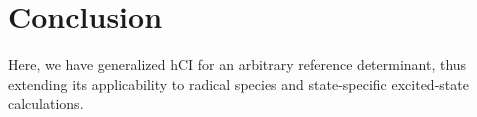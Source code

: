 \documentclass[aip,jcp,reprint,noshowkeys,superscriptaddress]{revtex4-1}
\newcommand{\SupInf}{\textcolor{blue}{Supporting Information}}
\newcommand{\mc}{\multicolumn}
\begin{document}

\section{Conclusion}
\label{sec:conclusion}

Here, we have generalized hCI \cite{Kossoski_2022} for an arbitrary reference determinant, thus extending its applicability to radical species and state-specific excited-state calculations.
\end{document}

